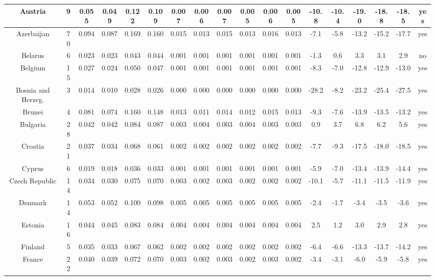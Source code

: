 \documentclass[10pt]{article}
\begin{document}
\begin{center}
\begin{tabular}{|c|c|c|c|c|c|c|c|c|c|c|c|c|c|c|c|c|c|}
\hline
Austria & 9 & 0.055 & 0.049 & 0.122 & 0.109 & 0.007 & 0.006 & 0.007 & 0.005 & 0.006 & 0.005 & -10.8 & -10.4 & -19.0 & -18.8 & -18.5 & yes \\
\hline
Azerbaijan & 70 & 0.094 & 0.087 & 0.169 & 0.160 & 0.015 & 0.013 & 0.015 & 0.013 & 0.016 & 0.013 & -7.1 & -5.8 & -13.2 & -15.2 & -17.7 & yes \\
\hline
Belarus & 6 & 0.023 & 0.023 & 0.043 & 0.044 & 0.001 & 0.001 & 0.001 & 0.001 & 0.001 & 0.001 & -1.3 & 0.6 & 3.3 & 3.1 & 2.9 & no \\
\hline
Belgium & 15 & 0.027 & 0.024 & 0.050 & 0.047 & 0.001 & 0.001 & 0.001 & 0.001 & 0.001 & 0.001 & -8.3 & -7.0 & -12.8 & -12.9 & -13.0 & yes \\
\hline
Bosnia and Herzeg. & 3 & 0.014 & 0.010 & 0.028 & 0.026 & 0.000 & 0.000 & 0.000 & 0.000 & 0.000 & 0.000 & -28.2 & -8.2 & -23.2 & -25.4 & -27.5 & yes \\
\hline
Brunei & 4 & 0.081 & 0.074 & 0.160 & 0.148 & 0.013 & 0.011 & 0.014 & 0.012 & 0.015 & 0.013 & -9.3 & -7.6 & -13.9 & -13.5 & -13.2 & yes \\
\hline
Bulgaria & 28 & 0.042 & 0.042 & 0.084 & 0.087 & 0.003 & 0.004 & 0.003 & 0.004 & 0.003 & 0.003 & 0.9 & 3.7 & 6.8 & 6.2 & 5.6 & yes \\
\hline
Croatia & 21 & 0.037 & 0.034 & 0.068 & 0.061 & 0.002 & 0.002 & 0.002 & 0.002 & 0.002 & 0.002 & -7.7 & -9.3 & -17.5 & -18.0 & -18.5 & yes \\
\hline
Cyprus & 6 & 0.019 & 0.018 & 0.036 & 0.033 & 0.001 & 0.001 & 0.001 & 0.001 & 0.001 & 0.001 & -5.9 & -7.0 & -13.4 & -13.9 & -14.4 & yes \\
\hline
Czech Republic & 14 & 0.034 & 0.030 & 0.075 & 0.070 & 0.003 & 0.002 & 0.003 & 0.002 & 0.002 & 0.002 & -10.1 & -5.7 & -11.1 & -11.5 & -11.9 & yes \\
\hline
Denmark & 14 & 0.053 & 0.052 & 0.100 & 0.098 & 0.005 & 0.005 & 0.005 & 0.005 & 0.005 & 0.005 & -2.4 & -1.7 & -3.4 & -3.5 & -3.6 & yes \\
\hline
Estonia & 16 & 0.044 & 0.045 & 0.083 & 0.084 & 0.004 & 0.004 & 0.004 & 0.004 & 0.004 & 0.004 & 2.5 & 1.2 & 3.0 & 2.9 & 2.8 & yes \\
\hline
Finland & 5 & 0.035 & 0.033 & 0.067 & 0.062 & 0.002 & 0.002 & 0.002 & 0.002 & 0.002 & 0.002 & -6.4 & -6.6 & -13.3 & -13.7 & -14.2 & yes \\
\hline
France & 22 & 0.040 & 0.039 & 0.072 & 0.070 & 0.003 & 0.002 & 0.003 & 0.002 & 0.003 & 0.002 & -3.4 & -3.1 & -6.0 & -5.9 & -5.8 & yes \\

\end{tabular}
\end{center}
\end{document}
